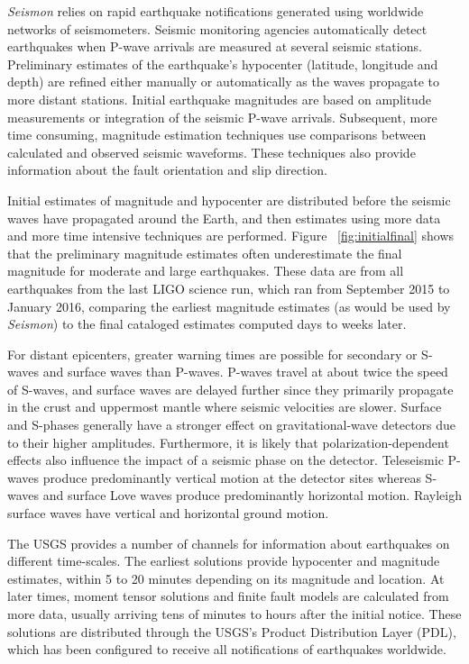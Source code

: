 \documentclass[twocolumn, aps, superscriptaddress]{revtex4}
\begin{document}
\emph{Seismon} relies on rapid earthquake notifications generated using worldwide networks of seismometers. Seismic monitoring agencies automatically detect earthquakes when P-wave arrivals are measured at several seismic stations. Preliminary estimates of the earthquake's hypocenter (latitude, longitude and depth) are refined either manually or automatically as the waves propagate to more distant stations. Initial earthquake magnitudes are based on amplitude measurements or integration of the seismic P-wave arrivals. Subsequent, more time consuming, magnitude estimation techniques use comparisons between calculated and observed seismic waveforms. These techniques also provide information about the fault orientation and slip direction.

Initial estimates of magnitude and hypocenter are distributed before the seismic waves have propagated around the Earth, and then estimates using more data and more time intensive techniques are performed. Figure~ \ref{fig:initialfinal} shows that the preliminary magnitude estimates often underestimate the final magnitude for moderate and large earthquakes. These data are from all earthquakes from the last LIGO science run, which ran from September 2015 to January 2016, comparing the earliest magnitude estimates (as would be used by \emph{Seismon}) to the final cataloged estimates computed days to weeks later.

For distant epicenters, greater warning times are possible for secondary or S-waves and surface waves than P-waves. P-waves travel at about twice the speed of S-waves, and
surface waves are delayed further since they primarily propagate in the crust and uppermost mantle where seismic velocities are slower.  Surface and S-phases generally have a stronger effect on gravitational-wave detectors due to their higher amplitudes.
Furthermore, it is likely that polarization-dependent effects also influence the impact of a seismic phase on the detector. Teleseismic P-waves produce predominantly vertical motion at the detector sites whereas S-waves and surface Love waves produce predominantly horizontal motion. Rayleigh surface waves have vertical and horizontal ground motion.

The USGS provides a number of channels for information about earthquakes on different time-scales. The earliest solutions provide hypocenter and magnitude estimates, within 5 to 20 minutes depending on its magnitude and location. At later times, moment tensor solutions and finite fault models are calculated from more data, usually arriving tens of minutes to hours after the initial notice. These solutions are distributed through the USGS's Product Distribution Layer (PDL), which has been configured to receive all notifications of earthquakes worldwide.
\end{document}
